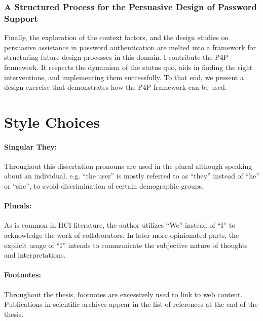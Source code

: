 \subsubsection{A Structured Process for the Persuasive Design of Password Support}
Finally, the exploration of the context factors, and the design studies on persuasive assistance in password authentication are melted into a framework for structuring future design processes in this domain. I contribute the \gls{P4P} framework. It respects the dynamism of the status quo, aids in finding the right interventions, and implementing them successfully. To that end, we present a design exercise that demonstrates how the \gls{P4P} framework can be used. 




\section{Style Choices}

\paragraph{Singular They:} Throughout this dissertation pronouns are used in the plural although speaking about an individual, e.g. ``the user'' is mostly referred to as ``they'' instead of ``he'' or ``she'', to avoid discrimination of certain demographic groups. 
\paragraph{Plurals:} As is common in HCI literature, the author utilizes ``We'' instead of ``I'' to acknowledge the work of collaborators. In later more opinionated parts, the explicit usage of ``I'' intends to communicate the subjective nature of thoughts and interpretations.
\paragraph{Footnotes:} Throughout the thesis, footnotes are excessively used to link to web content. Publications in scientific archives appear in the list of references at the end of the thesis.



